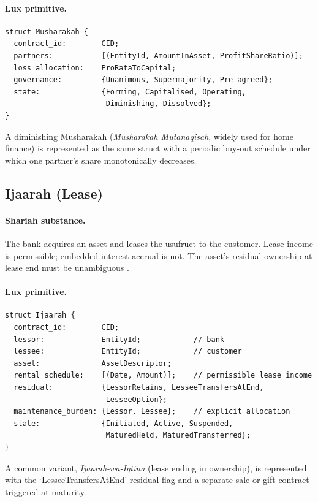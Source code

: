 \documentclass[11pt,letterpaper]{article}
\begin{document}
\paragraph{Lux primitive.}
\begin{verbatim}
struct Musharakah {
  contract_id:        CID;
  partners:           [(EntityId, AmountInAsset, ProfitShareRatio)];
  loss_allocation:    ProRataToCapital;
  governance:         {Unanimous, Supermajority, Pre-agreed};
  state:              {Forming, Capitalised, Operating,
                       Diminishing, Dissolved};
}
\end{verbatim}

A diminishing Musharakah (\emph{Musharakah Mutanaqisah}, widely used
for home finance) is represented as the same struct with a periodic
buy-out schedule under which one partner's share monotonically
decreases.

\subsection{Ijaarah (Lease)}

\paragraph{Shariah substance.} The bank acquires an asset and leases
the usufruct to the customer. Lease income is permissible; embedded
interest accrual is not. The asset's residual ownership at lease end
must be unambiguous \cite{aaoifi_standards}.

\paragraph{Lux primitive.}
\begin{verbatim}
struct Ijaarah {
  contract_id:        CID;
  lessor:             EntityId;            // bank
  lessee:             EntityId;            // customer
  asset:              AssetDescriptor;
  rental_schedule:    [(Date, Amount)];    // permissible lease income
  residual:           {LessorRetains, LesseeTransfersAtEnd,
                       LesseeOption};
  maintenance_burden: {Lessor, Lessee};    // explicit allocation
  state:              {Initiated, Active, Suspended,
                       MaturedHeld, MaturedTransferred};
}
\end{verbatim}

A common variant, \emph{Ijaarah-wa-Iqtina} (lease ending in
ownership), is represented with the `LesseeTransfersAtEnd' residual
flag and a separate sale or gift contract triggered at maturity.
\end{document}
